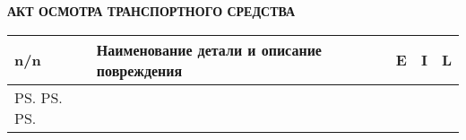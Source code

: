 \documentclass[a4paper,10pt]{report}
\begin{document}
    


%

\begin{center}
    {\Large \textbf{АКТ ОСМОТРА ТРАНСПОРТНОГО СРЕДСТВА}}
\end{center}




\begin{longtable}{G{3mm}|M{126mm}|G{8mm}|G{8mm}|G{8mm}}
     \hline %
    \hline
    \toprule 
    \bf  {\footnotesize  n/n}  &\bf {\small Наименование  детали и описание повреждения} & \bf {\small E} & \bf {\small I}& \bf {\small L}\\\hline\hline   \toprule  \endhead 
   
    \ps{ }{ }{ }{ }
    \ps{ }{ }{ }{ }
    \ps{ }{ }{ }{ }
  \end{longtable}
\end{document}
